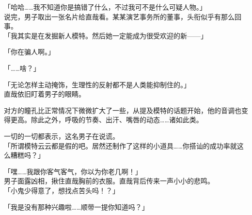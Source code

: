「哈哈……我不知道你是搞错了什么，不过我可不是什么可疑人物。」\\

说完，男子取出一张名片给直哉看。某某演艺事务所的董事，头衔似乎有那么回事。\\

「我其实是在发掘新人模特。然后她一定能成为很受欢迎的新——」

「你在骗人啊。」

「……啥？」

「无论怎样主动掩饰，生理性的反射都不是人类能抑制住的。」\\

直哉依旧盯着男子的眼睛。

对方的瞳孔比正常情况下微微扩大了一些，从提及模特的话题开始，他的音调也变得更高。除此之外，呼吸的节奏、出汗、嘴唇的动态……诸如此类。

一切的一切都表示，这名男子在说谎。\\

「所谓模特云云都是假的吧。居然还制作了这样的小道具……你搭讪的成功率就这么糟糕吗？」

「嘿……我跟你客气客气，你以为你老几啊！」\\

男子面露凶相，揪住直哉胸前的衣服。直哉背后传来一声小小的悲鸣。\\

「小鬼少得意了，想找点苦头吗！？」

「我是没有那种兴趣啦……顺带一提你知道吗？」

